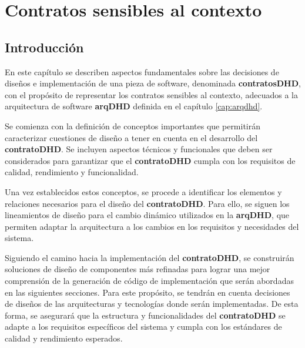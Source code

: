 \parskip=1cm

\chapter{Contratos sensibles al contexto}\label{cap:contratos}\label{cap:5}


\lstset{style=mystyle}

\section {Introducción}\label{sec:Introducción}


En este capítulo se describen aspectos fundamentales sobre las decisiones de diseños e implementación de una pieza de software, denominada \textbf{contratosDHD}, con el propósito de representar los contratos sensibles al contexto, adecuados a la arquitectura de software \textbf{arqDHD} definida en el capítulo \ref{cap:arqdhd}. 

Se comienza con la definición de conceptos importantes que permitirán caracterizar cuestiones de diseño a tener en cuenta en el desarrollo del \textbf{contratoDHD}. Se incluyen aspectos técnicos y funcionales que deben ser considerados para garantizar que el \textbf{contratoDHD} cumpla con los requisitos de calidad, rendimiento y funcionalidad.

Una vez establecidos estos conceptos, se procede a identificar los elementos y relaciones necesarios para el diseño del \textbf{contratoDHD}. Para ello, se siguen los lineamientos de diseño para el cambio dinámico utilizados en la \textbf{arqDHD}, que permiten adaptar la arquitectura a los cambios en los requisitos y necesidades del sistema.

Siguiendo el camino hacia la implementación del \textbf{contratoDHD}, se construirán soluciones de diseño de componentes más refinadas para lograr una mejor comprensión de la generación de código de implementación que serán abordadas en las siguientes secciones. Para este propósito, se tendrán en cuenta decisiones de diseños de las arquitecturas y tecnologías donde serán implementadas. De esta forma, se asegurará que la estructura y funcionalidades del \textbf{contratoDHD} se adapte a los requisitos específicos del sistema y cumpla con los estándares de calidad y rendimiento esperados.


